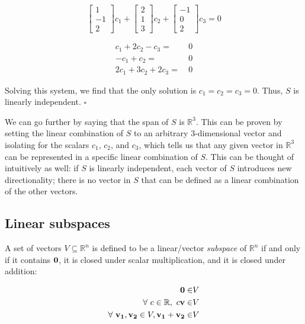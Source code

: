 \documentclass[../main.tex]{subfiles}
\begin{document}
\begin{solution}
	\begin{equation*}
		\begin{bmatrix} 1 \\ -1 \\ 2 \end{bmatrix}c_1
		+ \begin{bmatrix} 2 \\ 1 \\ 3 \end{bmatrix}c_2
		+ \begin{bmatrix} -1 \\ 0 \\ 2 \end{bmatrix}c_3 = 0
	\end{equation*}

	\begin{equation*}
		\begin{split}
			c_1+2c_2-c_3=   & \ 0 \\
			-c_1+c_2=       & \ 0 \\
			2c_1+3c_2+2c_3= & \ 0
		\end{split}
	\end{equation*}

	Solving this system, we find that the only solution is
	$c_1=c_2=c_3=0$. Thus, $S$ is linearly independent. $\square$

	We can go further by saying that the span of $S$ is $\mathbb{R}^3$. This
	can be proven by setting the linear combination of $S$ to an
	arbitrary 3-dimensional vector and isolating for the scalars $c_1$, $c_2$, and $c_3$,
	which tells us that any given vector in $\mathbb{R}^3$ can be represented
	in a specific linear combination of $S$. This can be thought of intuitively as well:
	if $S$ is linearly independent, each vector of $S$ introduces
	new directionality; there is no vector in $S$ that can be defined as a linear
	combination of the other vectors.
\end{solution}

\subsection{Linear subspaces}

\begin{definition}
	A set of vectors $V \subseteq \mathbb{R}^n$ is defined to be a linear/vector \textit{subspace}
	of $\mathbb{R}^n$ if and only if it contains $\mathbf{0}$,
	it is closed under scalar multiplication, and it is closed under addition:

	\begin{align*}
		\mathbf{0} \in                                                       & V \\
		\forall\ c \in \mathbb{R},\ c\mathbf{v} \in                          & V \\
		\forall\ \mathbf{v_1}, \mathbf{v_2} \in V, \mathbf{v_1} + \mathbf{v_2} \in & V
	\end{align*}
\end{definition}
\end{document}
